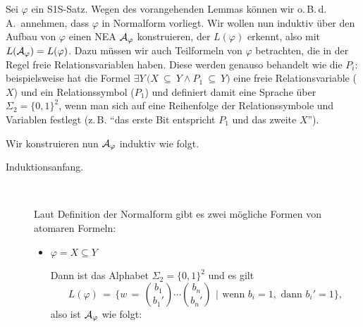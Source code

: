\documentclass[fontsize=11pt, twoside=false, numbers=autoenddot]{scrbook}
\begin{document}
\begin{beweis}
  Sei $\varphi$ ein S1S-Satz.
  Wegen des vorangehenden Lemmas können wir o.\,B.\,d.\,A.\ annehmen,
  dass $\varphi$ in Normalform vorliegt.
  Wir wollen nun induktiv über den Aufbau von $\varphi$ einen NEA $\mathcal{A}_\varphi$ konstruieren,
  der $L(\varphi)$ erkennt, also mit $L(\mathcal{A}_\varphi) = L(\varphi)$.
  Dazu müssen wir auch Teilformeln von $\varphi$ betrachten, die in der Regel
  freie Relationsvariablen haben. Diese werden genauso behandelt wie die $P_i$:
  beispielsweise hat die Formel $\exists Y\,\big(X \!\!\:\subseteq\!\!\: Y \land P_1 \!\!\:\subseteq\!\!\: Y\big)$
  eine freie Relationsvariable ($X$) und ein Relationssymbol ($P_1$)
  und definiert damit eine Sprache über $\Sigma_2 = \{0,1\}^2$,
  wenn man sich auf eine Reihenfolge der Relationssymbole und Variablen festlegt
  (z.\,B. "`das erste Bit entspricht $P_1$ und das zweite $X$"').

  Wir konstruieren nun $\mathcal{A}_\varphi$ induktiv wie folgt.
  \begin{description}
    \item[Induktionsanfang.]~
      \par
      Laut Definition der Normalform gibt es zwei mögliche Formen von atomaren Formeln:
      \begin{itemize}
        \item
          $\varphi = X \subseteq Y$
          ~\par
          Dann ist das Alphabet $\Sigma_2 = \{0,1\}^2$ und es gilt
          \[
            L(\varphi) \,=\, \Bigg\{ w \,=\,\binom{b_1}{b_1'}\cdots\binom{b_n}{b_n'} \,~\Bigg|~\, \text{wenn~} b_i=1, \text{~dann~} b_i'=1\Bigg\},
          \]
          also ist $\mathcal{A}_\varphi$ wie folgt:
          \begin{center}
\end{center}
\end{itemize}
\end{description}
\end{beweis}
\end{document}

